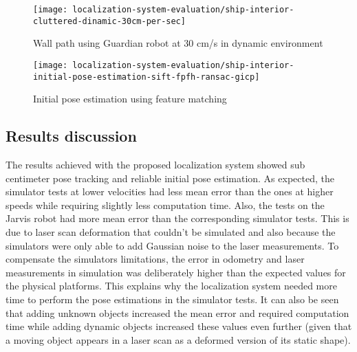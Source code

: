 \begin{figure}[H]
	\centering
	\texttt{[image: localization-system-evaluation/ship-interior-cluttered-dinamic-30cm-per-sec]}
	\caption{Wall path using Guardian robot at 30 cm/s in dynamic environment}
	\label{fig:localization-system-evaluation_ship-interior-cluttered-dinamic-30cm-per-sec}
\end{figure}

\begin{figure}[H]
	\centering
	\texttt{[image: localization-system-evaluation/ship-interior-initial-pose-estimation-sift-fpfh-ransac-gicp]}
	\caption{Initial pose estimation using feature matching}
	\label{fig:localization-system-evaluation_ship-interior-initial-pose-estimation-sift-fpfh-ransac-gicp}
\end{figure}



\subsection{Results discussion}

The results achieved with the proposed localization system showed sub centimeter pose tracking and reliable initial pose estimation. As expected, the simulator tests at lower velocities had less mean error than the ones at higher speeds while requiring slightly less computation time. Also, the tests on the Jarvis robot had more mean error than the corresponding simulator tests. This is due to laser scan deformation that couldn't be simulated and also because the simulators were only able to add Gaussian noise to the laser measurements. To compensate the simulators limitations, the error in odometry and laser measurements in simulation was deliberately higher than the expected values for the physical platforms. This explains why the localization system needed more time to perform the pose estimations in the simulator tests. It can also be seen that adding unknown objects increased the mean error and required computation time while adding dynamic objects increased these values even further (given that a moving object appears in a laser scan as a deformed version of its static shape).

